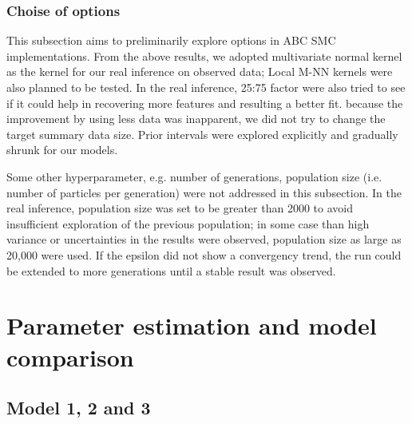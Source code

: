 

\subsubsection{Choise of options} 

This subsection aims to preliminarily explore options in ABC SMC implementations. From the above results, we adopted multivariate normal kernel as the kernel for our real inference on observed data; Local M-NN kernels were also planned to be tested. In the real inference, 25:75 factor were also tried to see if it could help in recovering more features and resulting a better fit. because the improvement by using less data was inapparent, we did not try to change the target summary data size. Prior intervals were explored explicitly and gradually shrunk for our models.

Some other hyperparameter, e.g. number of generations, population size (i.e. number of particles per generation) were not addressed in this subsection. In the real inference, population size was set to be greater than 2000 to avoid insufficient exploration of the previous population; in some case than high variance or uncertainties in the results were observed, population size as large as 20,000 were used. If the epsilon did not show a convergency trend, the run could be extended to more generations until a stable result was observed.









\section{Parameter estimation and model comparison}

\subsection{Model 1, 2 and 3}


